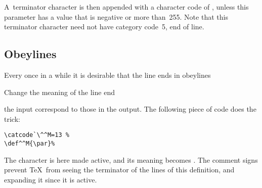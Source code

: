 \documentclass{book}
\begin{document}
A~terminator character is then appended
with a character code of , 
unless this parameter has a value that
is negative or more than~255. 
Note that this terminator character
need not have category code~5, end of line.

\subsection{Obeylines}

Every once in a while it is desirable that the line ends in
%
\cstoidx obeylines\par\howto Change the meaning of the line end\par
the input correspond to those in the output.
The following piece of code does the trick:
\begin{verbatim}
\catcode`\^^M=13 %
\def^^M{\par}% 
\end{verbatim}
The  character is here made active,
and its meaning becomes .
The comment signs prevent \TeX\ from seeing the terminator of the
\alt
lines of this definition, and expanding it since it is active.
\end{document}
